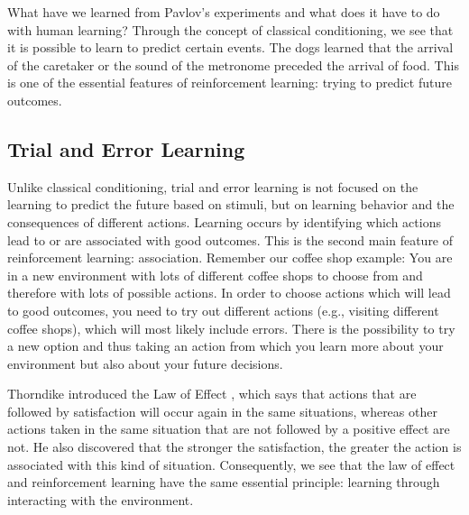 What have we learned from Pavlov's experiments and what does it have to do with human learning? Through the concept of classical conditioning, we see that it is possible to learn to predict certain events. The dogs learned that the arrival of the caretaker or the sound of the metronome preceded the arrival of food. This is one of the essential features of reinforcement learning: trying to predict future outcomes. %

\subsection{Trial and Error Learning}
Unlike classical conditioning, trial and error learning is not focused on the learning to predict the future based on stimuli, but on learning behavior and the consequences of different actions. Learning occurs by identifying which actions lead to or are associated with good outcomes. This is the second main feature of reinforcement learning: association. 
Remember our coffee shop example: You are in a new environment with lots of different coffee shops to choose from and therefore with lots of possible actions. 
In order to choose actions which will lead to good outcomes, you need to try out different actions (e.g., visiting different coffee shops), which will most likely include errors. 
There is the possibility to try a new option and thus taking an action from which you learn more about your environment but also about your future decisions. %

Thorndike introduced the Law of Effect \citep{thorndike1927law}, which says that actions that are followed by satisfaction will occur again in the same situations, whereas other actions taken in the same situation that are not followed by a positive effect are not. %
He also discovered that the stronger the satisfaction, the greater the action is associated with this kind of situation. Consequently, we see that the law of effect and reinforcement learning have the same essential principle: learning through interacting with the environment.

